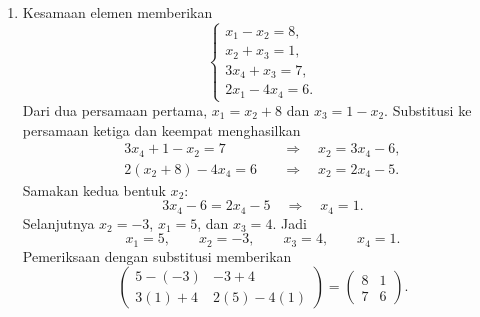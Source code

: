 \documentclass[11pt,a4paper]{article}
\begin{document}
\begin{enumerate}
\begin{enumerate}
\item 
Kesamaan elemen memberikan
\[
    \begin{cases}
        x_1-x_2=8,\\
        x_2+x_3=1,\\
        3x_4+x_3=7,\\
        2x_1-4x_4=6.
    \end{cases}
\]
Dari dua persamaan pertama,
$x_1=x_2+8$ dan $x_3=1-x_2$.
Substitusi ke persamaan ketiga dan keempat menghasilkan
\begin{align*}
    3x_4+1-x_2=7&\quad\Longrightarrow\quad x_2=3x_4-6,\\
    2(x_2+8)-4x_4=6&\quad\Longrightarrow\quad x_2=2x_4-5.
\end{align*}
Samakan kedua bentuk $x_2$:
\[
    3x_4-6=2x_4-5\quad\Longrightarrow\quad x_4=1.
\]
Selanjutnya $x_2=-3$, $x_1=5$, dan $x_3=4$. Jadi
\[
    \boxed{x_1=5,\qquad x_2=-3,\qquad x_3=4,\qquad x_4=1}.
\]
Pemeriksaan dengan substitusi memberikan
\[
    \begin{pmatrix}
        5-(-3) & -3+4 \\
        3(1)+4 & 2(5)-4(1)
    \end{pmatrix}
    =\begin{pmatrix}8&1\\7&6\end{pmatrix}.
\]

\end{enumerate}


\end{enumerate}
\end{document}
